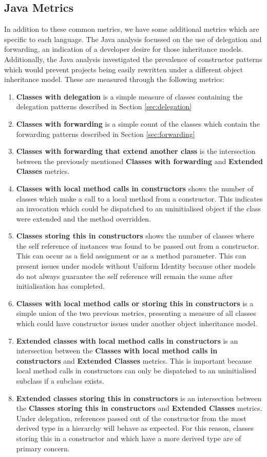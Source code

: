 \subsection{Java Metrics}
In addition to these common metrics, we have some additional metrics which are specific to each language. The Java analysis focussed on the use of delegation and forwarding, an indication of a developer desire for those inheritance models. Additionally, the Java analysis investigated the prevalence of constructor patterns which would prevent projects being easily rewritten under a different object inheritance model. These are measured through the following metrics:
\begin{enumerate}
	\item \textbf{Classes with delegation} is a simple measure of classes containing the delegation patterns described in Section \ref{sec:delegation}
	\item \textbf{Classes with forwarding} is a simple count of the classes which contain the forwarding patterns described in Section \ref{sec:forwarding}
	\item \textbf{Classes with forwarding that extend another class} is the intersection between the previously mentioned \textbf{Classes with forwarding} and \textbf{Extended Classes} metrics.
	\item \textbf{Classes with local method calls in constructors} shows the number of classes which make a call to a local method from a constructor. This indicates an invocation which could be dispatched to an uninitialised object if the class were extended and the method overridden.
	\item \textbf{Classes storing this in constructors} shows the number of classes where the self reference of instances was found to be passed out from a constructor. This can occur as a field assignment or as a method parameter. This can present issues under models without Uniform Identity because other models do not always guarantee the self reference will remain the same after initialisation has completed.
	\item \textbf{Classes with local method calls or storing this in constructors} is a simple union of the two previous metrics, presenting a measure of all classes which could have constructor issues under another object inheritance model.
	\item \textbf{Extended classes with local method calls in constructors} is an intersection between the \textbf{Classes with local method calls in constructors} and \textbf{Extended Classes} metrics. This is important because local method calls in constructors can only be dispatched to an uninitialised subclass if a subclass exists.
	\item \textbf{Extended classes storing this in constructors} is an intersection between the \textbf{Classes storing this in constructors} and \textbf{Extended Classes} metrics. Under delegation, references passed out of the constructor from the most derived type in a hierarchy will behave as expected. For this reason, classes storing this in a constructor and which have a more derived type are of primary concern.
\end{enumerate}

